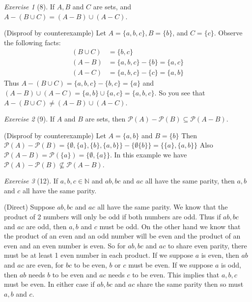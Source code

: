 \documentclass[12pt]{amsart}
\makeatletter
\theoremstyle{remark}
\newtheorem*{exercise}{Exercise}%
\def\NN{\ensuremath{\mathbb N}}
\newcommand{\mc}[1]{\ensuremath{\mathcal{#1}}} %
\renewenvironment{proof}[1][\proofname]{\par\doublespacing
  \pushQED{\qed}%
  \normalfont \topsep6\p@\@plus6\p@\relax
  \list{}{%
    \settowidth{\leftmargin}{\itshape\proofname:\hskip\labelsep}%
    \setlength{\labelwidth}{0pt}%
    \setlength{\itemindent}{-\leftmargin}%
  }%
  \item[\hskip\labelsep\itshape#1\@addpunct{:}]\ignorespaces
}{%
  \popQED\endlist\@endpefalse
  \singlespacing
}
\theoremstyle{mycomment}
\makeatother
\begin{document}
\begin{exercise}[8] If $A, B$ and $C$ are sets, and $A-(B\cup C)=(A-B)\cup (A-C)$.
\begin{proof}%
  (Disproof by counterexample) Let $A = \{a,b,c\}, B = \{b\}$, and $C = \{c\}$. Observe the following facts:
  \begin{align*}
    (B \cup C) & = \{b, c\} \\
    (A - B) &= \{a,b,c\} - \{b\} = \{a,c\} \\
    (A - C) &= \{a,b,c\} - \{c\} = \{a,b\} 
  \end{align*}
Thus $A - (B\cup C) = \{a,b,c\} - \{b,c\} = \{a\}$ and $(A-B) \cup (A - C) = \{a,b\} \cup \{a,c\} = \{a,b,c\}$. So you see that $A-(B\cup C)\neq(A-B)\cup (A-C)$.
\end{proof}
\end{exercise}

\begin{exercise}[9] If $A$ and $B$ are sets, then $\mc P(A)-\mc P(B)\subseteq \mc P(A - B)$.
\begin{proof}%
  (Disproof by counterexample) Let $ A = \{a,b\}$ and $B = \{b\}$ Then $\mc P(A) - \mc P(B) = \{ \emptyset, \{a\}, \{b\}, \{a,b\} \} - \{ \emptyset \{b\}\} = \{\{a\}, \{a,b\}\} $ Also $\mc P(A-B) = \mc P(\{a\}) = \{\emptyset, \{a\}\}$. In this example we have $\mc P(A)-\mc P(B)\nsubseteq \mc P(A - B)$.
\end{proof}
\end{exercise}

\begin{exercise}[12] If $a,b,c\in\NN$ and $ab, bc$ and $ac$ all have the same parity, then $a,b$ and $c$ all have the same parity.
\begin{proof}%
  (Direct) Suppose $ab, bc$ and $ac$ all have the same parity. We know that the product of 2 numbers will only be odd if both numbers are odd. Thus if $ab, bc$ and $ac$ are odd, then $a,b$ and $c$ must be odd. On the other hand we know that the product of an even and an odd number will be even and the product of an even and an even number is even. So for $ab, bc$ and $ac$ to share even parity, there must be at least 1 even number in each product. If we suppose $a$ is even, then $ab$ and $ac$ are even, for $bc$ to be even, $b$ or $c$ must be even. If we suppose $a$ is odd, then $ab$ needs $b$ to be even and $ac$ needs $c$ to be even. This implies that $a,b,c$ must be even. In either case if $ab, bc$ and $ac$ share the same parity then so must $a,b$ and $c$.
\end{proof}
\end{exercise}
\end{document}
